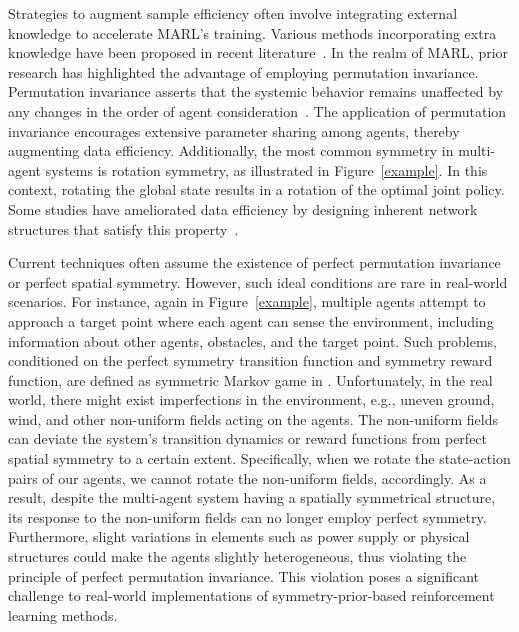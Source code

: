 \documentclass[letterpaper]{article} %
\theoremstyle{definition}
\begin{document}
Strategies to augment sample efficiency often involve integrating external knowledge to accelerate MARL's training. Various methods incorporating extra knowledge have been proposed in recent literature~\cite{shi2021physics,shi2021tits}. In the realm of MARL, prior research has highlighted the advantage of employing permutation invariance. Permutation invariance asserts that the systemic behavior remains unaffected by any changes in the order of agent consideration~\cite{api}. The application of permutation invariance encourages extensive parameter sharing among agents, thereby augmenting data efficiency. Additionally, the most common symmetry in multi-agent systems is rotation symmetry, as illustrated in Figure~\ref{example}. In this context, rotating the global state results in a rotation of the optimal joint policy. Some studies have ameliorated data efficiency by designing inherent network structures that satisfy this property~\cite{vand}.

Current techniques often assume the existence of perfect permutation invariance or perfect spatial symmetry. However, such ideal conditions are rare in real-world scenarios. For instance, again in Figure~\ref{example}, multiple agents attempt to approach a target point where each agent can sense the environment, including information about other agents, obstacles, and the target point. Such problems, conditioned on the perfect symmetry transition function and symmetry reward function, are defined as symmetric Markov game in \cite{vand,yu2023esp}. Unfortunately, in the real world, there might exist imperfections in the environment, e.g., uneven ground, wind, and other non-uniform fields acting on the agents. The non-uniform fields can deviate the system's transition dynamics or reward functions from perfect spatial symmetry to a certain extent. Specifically, when we rotate the state-action pairs of our agents, we cannot rotate the non-uniform fields, accordingly. As a result, despite the multi-agent system having a spatially symmetrical structure, its response to the non-uniform fields can no longer employ perfect symmetry. Furthermore, slight variations in elements such as power supply or physical structures could make the agents slightly heterogeneous, thus violating the principle of perfect permutation invariance. This violation poses a significant challenge to real-world implementations of symmetry-prior-based reinforcement learning methods. 
\end{document}
